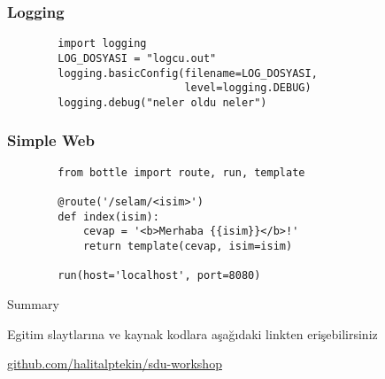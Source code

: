 \documentclass[10pt, compress]{beamer}
\begin{document}
\begin{frame}[fragile]
\frametitle{Logging}    
    \begin{verbatim}
        import logging
        LOG_DOSYASI = "logcu.out"
        logging.basicConfig(filename=LOG_DOSYASI, 
                            level=logging.DEBUG)
        logging.debug("neler oldu neler")
    \end{verbatim}
\end{frame}

\begin{frame}[fragile]
\frametitle{Simple Web}    
    \begin{verbatim}
        from bottle import route, run, template
        
        @route('/selam/<isim>')
        def index(isim):
            cevap = '<b>Merhaba {{isim}}</b>!'
            return template(cevap, isim=isim)
        
        run(host='localhost', port=8080)
    \end{verbatim}
\end{frame}

\begin{frame}{Summary}

  Egitim slaytlarına ve kaynak kodlara aşağıdaki linkten erişebilirsiniz

  \begin{center}\url{github.com/halitalptekin/sdu-workshop}\end{center}

\end{frame}

\end{document}
